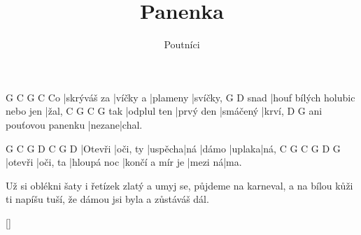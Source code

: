 \documentclass{song}
\title{Panenka}
\author{Poutníci}
\begin{document}
\strophe
   G           C        G        C
Co |skrýváš za |víčky a |plameny |svíčky,
     G                             D
snad |houf bílých holubic nebo jen |žal,
    C           G         C        G
tak |odplul ten |prvý den |smáčený |krví,
                     D      G
ani pouťovou panenku |nezane|chal.
\endstrophe

G       C        G       D   C     G      D
|Otevři |oči, ty |uspěcha|ná |dámo |uplaka|ná,
C       G        C           G               D       G
|otevři |oči, ta |hloupá noc |končí a mír je |mezi ná|ma.
\endstrophe

\strophe*
Už si oblékni šaty i řetízek zlatý
a umyj se, půjdeme na karneval,
a na bílou kůži ti napíšu tuší,
že dámou jsi byla a zůstáváš dál.
\endstrophe

\ref{}
\end{document}
